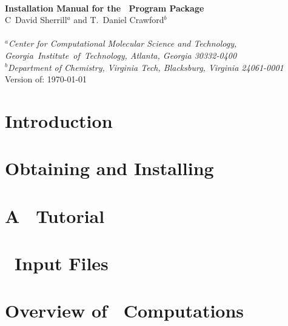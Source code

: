 \documentclass[12pt]{article}
\begin{document}


\begin{center}
\ \\
\vspace{2.0in}
{\bf {\Large Installation Manual for the \PSIthree\ Program Package}} \\
\vspace{0.5in}
C\ David Sherrill$^a$ and T.\ Daniel Crawford$^b$ \\
\ \\
{\em $^a$Center for Computational Molecular Science and Technology, \mbox{Georgia 
Institute of Technology,} Atlanta, Georgia 30332-0400} \\
\vspace{0.1in}
{\em $^b$Department of Chemistry, Virginia Tech, Blacksburg, Virginia 24061-0001}
\ \\
\vspace{0.3in}
Version of: \today
\end{center}

\thispagestyle{empty}

\newpage
\newpage

\section{Introduction} \label{introduction}
%

\section{Obtaining and Installing \PSIthree} \label{installation}


\section{A \PSIthree\ Tutorial} \label{tutorial}
%

\section{\PSIthree\ Input Files} \label{input}
%

\section{Overview of \PSIthree\ Computations} \label{overview}
\end{document}

